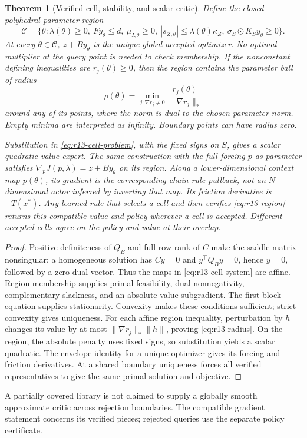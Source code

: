 \documentclass[11pt,letterpaper]{article}
\newtheorem{theorem}{Theorem}[section]
\theoremstyle{definition}
\newcommand{\1}{\mathbf 1}
\begin{document}
\begin{theorem}[Verified cell, stability, and scalar critic]\label{thm:r13-cells}
Define the closed polyhedral parameter region
\begin{equation}\label{eq:r13-region}
 \mathcal C=\{\theta:\lambda(\theta)\geq0,\ Fy_\theta\leq d,\
       \mu_{I,\theta}\geq0,\ |s_{Z,\theta}|\leq\lambda(\theta)\kappa_Z,\
       \sigma_S\mathbin{\odot}K_Sy_\theta\geq0\}.
\end{equation}
At every $\theta\in\mathcal C$, $z+By_\theta$ is the unique global accepted optimizer. No optimal multiplier at the query point is needed to check membership. If the nonconstant defining inequalities are $r_j(\theta)\geq0$, then the region contains the parameter ball of radius
\begin{equation}\label{eq:r13-radius}
 \rho(\theta)=\min_{j:\nabla r_j\ne0}
                 \frac{r_j(\theta)}{\|\nabla r_j\|_*}
\end{equation}
around any of its points, where the norm is dual to the chosen parameter norm. Empty minima are interpreted as infinity. Boundary points can have radius zero.

Substitution in \eqref{eq:r13-cell-problem}, with the fixed signs on $S$, gives a scalar quadratic value expert. The same construction with the full forcing $p$ as parameter satisfies $\nabla_p J(p,\lambda)=z+By_\theta$ on its region. Along a lower-dimensional context map $p(\theta)$, its gradient is the corresponding chain-rule pullback, not an $N$-dimensional actor inferred by inverting that map. Its friction derivative is $-T(x^*)$. Any learned rule that selects a cell and then verifies \eqref{eq:r13-region} returns this compatible value and policy wherever a cell is accepted. Different accepted cells agree on the policy and value at their overlap.
\end{theorem}
\begin{proof}
Positive definiteness of $Q_B$ and full row rank of $C$ make the saddle matrix nonsingular: a homogeneous solution has $Cy=0$ and $y^\top Q_By=0$, hence $y=0$, followed by a zero dual vector. Thus the maps in \eqref{eq:r13-cell-system} are affine. Region membership supplies primal feasibility, dual nonnegativity, complementary slackness, and an absolute-value subgradient. The first block equation supplies stationarity. Convexity makes these conditions sufficient; strict convexity gives uniqueness. For each affine region inequality, perturbation by $h$ changes its value by at most $\|\nabla r_j\|_*\|h\|$, proving \eqref{eq:r13-radius}. On the region, the absolute penalty uses fixed signs, so substitution yields a scalar quadratic. The envelope identity for a unique optimizer gives its forcing and friction derivatives. At a shared boundary uniqueness forces all verified representatives to give the same primal solution and objective.
\end{proof}
A partially covered library is not claimed to supply a globally smooth approximate critic across rejection boundaries. The compatible gradient statement concerns its verified pieces; rejected queries use the separate policy certificate.
\end{document}
